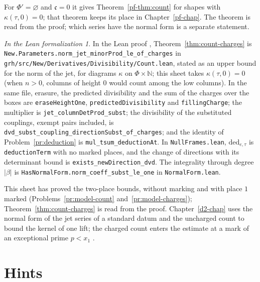 \documentclass[reqno]{amsart}
\newcounter{chap}
\theoremstyle{plain}
\theoremstyle{definition}
\theoremstyle{remark}
\newtheorem*{leanremark}{In the Lean formalization}
\newcommand{\N}{\mathbb{N}}
\newcommand{\ch}{\mathfrak{c}}
\newcommand{\tl}[1]{\texttt{#1}}
\begin{document}
For \(\Phi' = \varnothing\) and \(\ch = 0\) it gives Theorem~\ref{pf-thm:count} for shapes with \(\kappa(\tau, 0) = 0\); that theorem keeps its place in Chapter~\ref{pf-chap}.  The theorem is read from the proof; which series have the normal form is a separate statement.

\begin{leanremark}
\raggedright In the Lean proof \cite{GL}, Theorem~\ref{thm:count-charges} is \tl{New.\allowbreak Parameters.\allowbreak norm\_jet\_minorProd\_le\_of\_charges} in \tl{grh/src/New/Derivatives/Divisibility/Count.lean}, stated as an upper bound for the norm of the jet, for diagrams \(\kappa\) on \(\Phi \times \N\); this sheet takes \(\kappa(\tau, 0) = 0\) (when \(n > 0\), columns of height \(0\) would count among the low columns).  In the same file, erasure, the predicted divisibility and the sum of the charges over the boxes are \tl{eraseHeightOne}, \tl{predictedDivisibility} and \tl{fillingCharge}; the multiplier is \tl{jet\_columnDetProd\_subst}; the divisibility of the substituted couplings, exempt pairs included, is \tl{dvd\_subst\_coupling\_directionSubst\_of\_charges}; and the identity of Problem~\ref{pr:deduction} is \tl{mul\_tsum\_deductionAt}.  In \tl{NullFrames.lean}, \(\mathrm{ded}_{e,\tau}\) is \tl{deductionTerm} with no marked places, and the change of directions with its determinant bound is \tl{exists\_newDirection\_dvd}.  The integrality through degree \(\lvert\beta\rvert\) is \tl{HasNormalForm.\allowbreak norm\_coeff\_subst\_le\_one} in \tl{NormalForm.lean}.
\end{leanremark}

This sheet has proved the two-place bounds, without marking and with place \(1\) marked (Problems~\ref{pr:model-count} and~\ref{pr:model-charges}); Theorem~\ref{thm:count-charges} is read from the proof.  Chapter~\ref{d2-chap} uses the normal form of the jet series of a standard datum and the uncharged count to bound the kernel of one lift; the charged count enters the estimate at a mark of an exceptional prime \(p < x_1\) \cite{GL}.

\section*{Hints}
\end{document}

